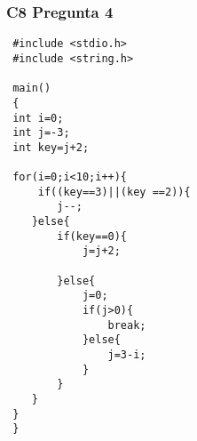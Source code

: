 \subsubsection{C8 Pregunta 4}

\lstset{language=C}      
 \begin{lstlisting}
 #include <stdio.h>
 #include <string.h>
 
 main()
 {
 int i=0;
 int j=-3;
 int key=j+2;
 
 for(i=0;i<10;i++){
     if((key==3)||(key ==2)){
 		j--;
 	}else{
 		if(key==0){
 			j=j+2;
 		
 		}else{
 			j=0;
 			if(j>0){
 				break;
 			}else{
 				j=3-i;
 			}
 		}
 	}		
 }
 }
 
 \end{lstlisting}